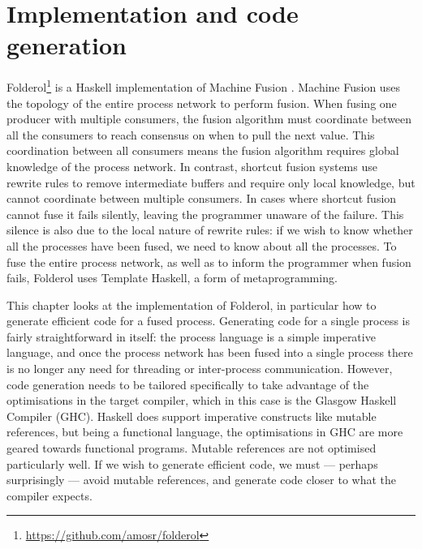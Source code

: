 \chapter{Implementation and code generation}
\label{chapter:process:implementation}

\iffalse

Folderol\footnote{\url{https://github.com/amosr/folderol}} is a Haskell implementation of Machine Fusion .
Machine Fusion uses the topology of the entire process network to perform fusion.
When fusing one producer with multiple consumers, the fusion algorithm must coordinate between all the consumers to reach consensus on when to pull the next value.
This coordination between all consumers means the fusion algorithm requires global knowledge of the process network.
In contrast, shortcut fusion systems  use rewrite rules to remove intermediate buffers and require only local knowledge, but cannot coordinate between multiple consumers.
In cases where shortcut fusion cannot fuse it fails silently, leaving the programmer unaware of the failure.
This silence is also due to the local nature of rewrite rules: if we wish to know whether all the processes have been fused, we need to know about all the processes.
To fuse the entire process network, as well as to inform the programmer when fusion fails, Folderol uses Template Haskell, a form of metaprogramming.

This chapter looks at the implementation of Folderol, in particular how to generate efficient code for a fused process.
Generating code for a single process is fairly straightforward in itself: the process language is a simple imperative language, and once the process network has been fused into a single process there is no longer any need for threading or inter-process communication.
However, code generation needs to be tailored specifically to take advantage of the optimisations in the target compiler, which in this case is the Glasgow Haskell Compiler (GHC).
Haskell does support imperative constructs like mutable references, but being a functional language, the optimisations in GHC are more geared towards functional programs.
Mutable references are not optimised particularly well.
If we wish to generate efficient code, we must --- perhaps surprisingly --- avoid mutable references, and generate code closer to what the compiler expects.

